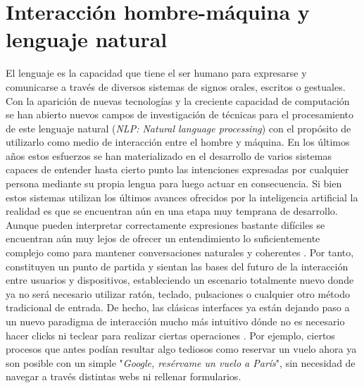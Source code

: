 \section{Interacción hombre-máquina y lenguaje natural}

El lenguaje es la capacidad que tiene el ser humano para expresarse y comunicarse a través de diversos sistemas de signos orales, escritos o gestuales. Con la aparición de nuevas tecnologías y la creciente capacidad de computación se han abierto nuevos campos de investigación de técnicas para el procesamiento de este lenguaje natural (\textit{NLP: Natural language processing}) con el propósito de utilizarlo como medio de interacción entre el hombre y máquina. En los últimos años estos esfuerzos se han materializado en el desarrollo de varios sistemas capaces de entender hasta cierto punto las intenciones expresadas por cualquier persona mediante su propia lengua para luego actuar en consecuencia. Si bien estos sistemas utilizan los últimos avances ofrecidos por la inteligencia artificial la realidad es que se encuentran aún en una etapa muy temprana de desarrollo. Aunque pueden interpretar correctamente expresiones bastante difíciles se encuentran aún muy lejos de ofrecer un entendimiento lo suficientemente complejo como para mantener conversaciones naturales y coherentes \cite{designTechniques}. Por tanto, constituyen un punto de partida y sientan las bases del futuro de la interacción entre usuarios y dispositivos, estableciendo un escenario totalmente nuevo donde ya no será necesario utilizar ratón, teclado, pulsaciones o cualquier otro método tradicional de entrada. De hecho, las clásicas interfaces ya están dejando paso a un nuevo paradigma de interacción mucho más intuitivo dónde no es necesario hacer clicks ni teclear para realizar ciertas operaciones \cite{conversationSystems}. Por ejemplo, ciertos procesos que antes podían resultar algo tediosos como reservar un vuelo ahora ya son posible con un simple "\textit{Google, resérvame un vuelo a París}", sin necesidad de navegar a través distintas webs ni rellenar formularios.\\

